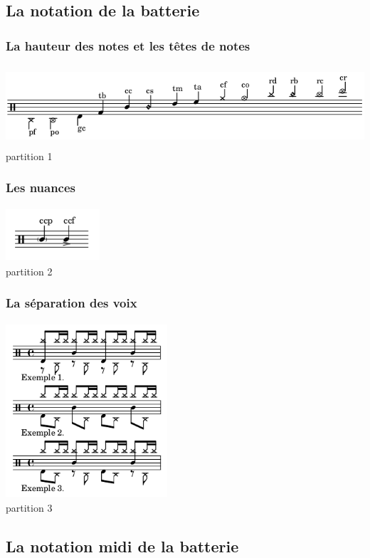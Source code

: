 \subsection{La notation de la batterie}
\subsubsection{La hauteur des notes et les têtes de notes}
\includegraphics[height=30mm, width=155mm]{z_images/1_description_notation/notes.png}
partition 1
\subsubsection{Les nuances}
\includegraphics[height=20mm, width=35mm]{z_images/1_description_notation/nuances.png}\\
partition 2
\subsubsection{La séparation des voix}
\includegraphics[height=65mm, width=60mm]{z_images/1_description_notation/separation/0_exemples_separation.png}\\
partition 3
\subsection{La notation midi de la batterie}
